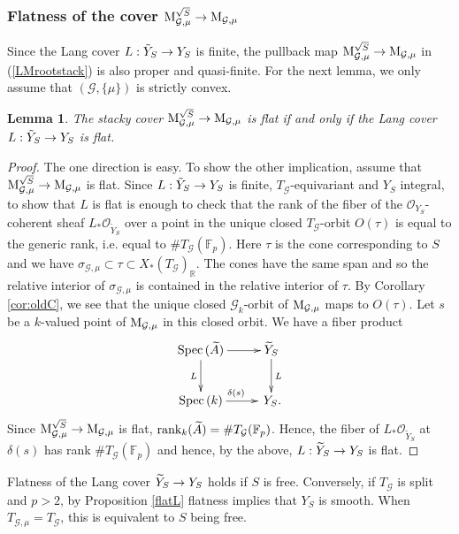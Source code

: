 \documentclass[reqno, 10pt]{amsart}
\makeatletter
\newcommand{\BF}{\ensuremath{\mathbb {F}}\xspace}
\newcommand{\BR}{\ensuremath{\mathbb {R}}\xspace}
\newcommand{\CG}{\ensuremath{\mathcal {G}}\xspace}
\newcommand{\CO}{\ensuremath{\mathcal {O}}\xspace}
\DeclareMathOperator{\Spec}{Spec\,}
\newcommand{\wt}{\widetilde}
\newtheorem{lemma}[subsubsection]{Lemma}
\theoremstyle{definition}
\numberwithin{equation}{subsection}
\numberwithin{subsubsection}{subsection}
\renewcommand{\to}{%
   \ifbool{@display}{\longrightarrow}{\rightarrow}%
   }
\newcommand{\Mloc}{{\rm M}}
\newcommand{\ti}{\tilde}
\newcommand{\Mlocroot}{{\mathrm M}^{\sqrt{S}}}
\makeatother
\begin{document}
\subsubsection{Flatness of the cover $\Mlocroot_{\CG,\mu}\to \Mloc_{\CG,\mu}$}

Since 
 the Lang cover $L: \ti Y_S\to Y_S$ is finite, the pullback map $\Mlocroot_{\CG,\mu}\to \Mloc_{\CG,\mu}$  in (\ref{LMrootstack})  is also proper and quasi-finite. 
 For the next lemma, we only  assume that $(\CG,\{\mu\})$ is strictly convex. 
 
 \begin{lemma}\label{rootback}
The stacky cover $\Mlocroot_{\CG,\mu}\to \Mloc_{\CG,\mu}$ is flat if and only if the Lang cover $L: \ti Y_S\to Y_S$ is flat. 
 \end{lemma}
 
 \begin{proof} The one direction is easy. To show the other implication, assume that $\Mlocroot_{\CG,\mu}\to \Mloc_{\CG,\mu}$ is flat. Since $L: \ti Y_S\to Y_S$ is finite, $T_\CG$-equivariant and $Y_S$ integral, to show that $L$ is flat is enough to check that the rank of the fiber of the $\CO_{Y_S}$-coherent sheaf $L_*\CO_{\wt Y_S}$
 over a point in the unique closed $T_\CG$-orbit $O(\tau)$ is equal to the generic rank, i.e. equal to $\# T_\CG(\BF_p)$. Here $\tau$ is the cone corresponding to $S$ and we have $\sigma_{\CG,\mu}\subset \tau\subset X_*(T_\CG)_\BR$. 
  The cones have the same span and so the relative interior of $\sigma_{\CG,\mu}$ is contained in the relative interior of $\tau$.
 By Corollary \ref{cor:oldC}, we see that the unique closed $\CG_k$-orbit of $\Mloc_{\CG,\mu}$ maps to $O(\tau)$. Let $s$ be a $k$-valued point of $\Mloc_{\CG,\mu}$ in this closed orbit. We have a fiber product
 \begin{equation}\label{fiberedClosed}
\begin{aligned}
 \xymatrix{
      \Spec(\wt A) \ar[r] \ar[d]_L  &     \wt Y_S   \ar[d]^L \\
       \Spec(k)\ar[r]^{\delta(s)} &  \, Y_S.   
        }
        \end{aligned}
\end{equation}
Since $\Mlocroot_{\CG,\mu}\to \Mloc_{\CG,\mu}$ is flat, ${\rm rank}_k(\wt A)=\# T_\CG(\BF_p)$.
Hence, the fiber of $L_*\CO_{\wt Y_S}$ at $\delta(s)$ has rank $\# T_\CG(\BF_p)$ and hence, by the above, $L:\wt Y_S\to Y_S$ is flat.
\end{proof}

 Flatness of the Lang cover $\wt Y_S\to Y_S$ holds if  $S$ is free. 
  Conversely, if $T_{\mathcal G}$ is split and $p>2$, by Proposition \ref{flatL} flatness implies that $Y_S$ is smooth. When 
 $T_{\CG,\mu}=T_{\CG}$, this is equivalent to $S$ being free.
 
\end{document}
